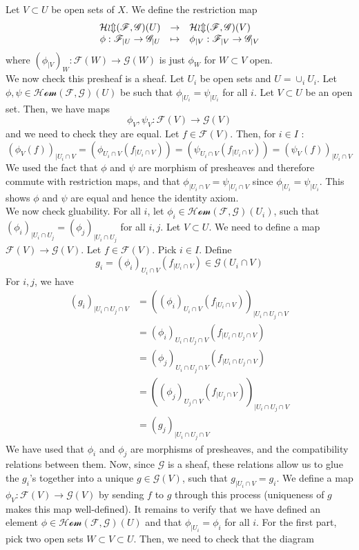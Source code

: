 \documentclass{article}
\newcommand{\applic}[4]{\begin{array}[t]{rcl}
#1 & \to & #2 \\
#3 & \mapsto & #4
\end{array}}
\newcommand{\Fsheaf}{\mathscr{F}}
\newcommand{\Gsheaf}{\mathscr{G}}
\newcommand{\sheafHom}{\mathcal{Hom}}
\newcommand{\exercise}{\subsubsection} %
\begin{document}
\exercise{} Let $V\subset U$ be open sets of $X$. We define the restriction map
\[\applic{\sheafHom(\Fsheaf,\Gsheaf)(U)}{\sheafHom(\Fsheaf,\Gsheaf)(V)}{\phi : \Fsheaf_{\mid U} \to \Gsheaf_{\mid U}}{\phi_{\mid V} : \Fsheaf_{\mid V} \to \Gsheaf_{\mid V}}\]
where $(\phi_{\mid V})_W : \Fsheaf(W) \to \Gsheaf(W)$ is just $\phi_W$ for $W \subset V$ open. \\
We now check this presheaf is a sheaf. Let $U_i$ be open sets and $U = \cup_i U_i$. Let $\phi,\psi \in \sheafHom(\Fsheaf, \Gsheaf)(U)$ be such that $\phi_{\mid U_i} = \psi_{\mid U_i}$ for all $i$. Let $V \subset U$ be an open set. Then, we have maps 
\[\phi_V,\psi_V : \Fsheaf(V) \to \Gsheaf(V)\]
and we need to check they are equal. Let $f \in \Fsheaf(V)$. Then, for $i \in I$ :
\[(\phi_V (f))_{\mid U_i \cap V}
= (\phi_{U_i \cap V} (f_{\mid U_i \cap V}))
= (\psi_{U_i \cap V} (f_{\mid U_i \cap V}))
= (\psi_V (f))_{\mid U_i \cap V}\]
We used the fact that $\phi$ and $\psi$ are morphism of presheaves and therefore commute with restriction maps, and that $\phi_{\mid U_i \cap V} = \psi_{\mid U_i \cap V}$ since $\phi_{\mid U_i} = \psi_{\mid U_i}$. This shows $\phi$ and $\psi$ are equal and hence the identity axiom. \\
We now check gluability. For all $i$, let $\phi_i \in \sheafHom(\Fsheaf,\Gsheaf)(U_i)$, such that $(\phi_i)_{\mid U_i \cap U_j} = (\phi_j)_{\mid U_i \cap U_j}$ for all $i,j$. Let $V \subset U$. We need to define a map $\Fsheaf(V) \to \Gsheaf(V)$. Let $f \in \Fsheaf(V)$. Pick $i \in I$. Define
\[g_i = (\phi_i)_{U_i \cap V} (f_{\mid U_i \cap V}) \in \Gsheaf(U_i \cap V)\]
For $i,j$, we have
\begin{align*}
    (g_i)_{\mid U_i \cap U_j \cap V} & = ((\phi_i)_{U_i \cap V} (f_{\mid U_i \cap V}))_{\mid U_i \cap U_j \cap V} \\
    & = (\phi_i)_{U_i \cap U_j \cap V} (f_{\mid U_i \cap U_j \cap V}) \\
    & = (\phi_j)_{U_i \cap U_j \cap V} (f_{\mid U_i \cap U_j \cap V}) \\
    & = ((\phi_j)_{U_j \cap V} (f_{\mid U_j \cap V}))_{\mid U_i \cap U_j \cap V} \\
    & = (g_j)_{\mid U_i \cap U_j \cap V}
\end{align*}
We have used that $\phi_i$ and $\phi_j$ are morphisms of presheaves, and the compatibility relations between them. Now, since $\Gsheaf$ is a sheaf, these relations allow us to glue the $g_i$'s together into a unique $g \in \Gsheaf(V)$, such that $g_{\mid U_i \cap V} = g_i$. We define a map $\phi_V : \Fsheaf(V) \to \Gsheaf(V)$ by sending $f$ to $g$ through this process (uniqueness of $g$ makes this map well-defined). It remains to verify that we have defined an element $\phi \in \sheafHom(\Fsheaf,\Gsheaf)(U)$ and that $\phi_{\mid U_i} = \phi_i$ for all $i$. For the first part, pick two open sets $W \subset V \subset U$. Then, we need to check that the diagram
\end{document}
